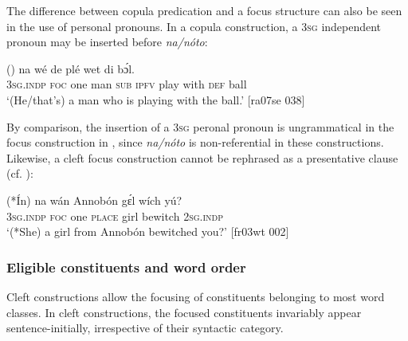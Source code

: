 \ea%
    \label{ex:key:698}
\z\z

The difference between copula predication and a focus structure can also be seen in the use of personal pronouns. In a copula construction, a \textsc{3sg} independent pronoun may be inserted before \textit{na}\textit{\textup{/}}\textit{nóto}:


\ea%
    \label{ex:key:699}
    \gll ()    na       wé  de  plé  wet    di  bɔ́l.\\
\textsc{3sg.indp}  \textsc{foc}  one    man    \textsc{sub}  \textsc{ipfv}  play  with    \textsc{def}  ball\\

\glt ‘(He/that’s) a man who is playing with the ball.’ [ra07se 038]
\z

By comparison, the insertion of a \textsc{3sg} peronal pronoun is ungrammatical in the focus construction in , since \textit{na}\textit{\textup{/}}\textit{nóto} is non-referential in these constructions. Likewise, a cleft focus construction cannot be rephrased as a presentative clause (cf. ):


\ea%
    \label{ex:key:700}
    \gll (*\'{I}n)  na  wán    Annobón  gɛ́l    wích  yú?\\
\textsc{3sg.indp}  \textsc{foc}  one    \textsc{place}    girl    bewitch  \textsc{2sg.indp}\\

\glt ‘(*She) a girl from Annobón bewitched you?’ [fr03wt 002]
\z

\subsubsection{Eligible constituents and word order}\label{sec:7.4.3.2}
Cleft constructions allow the focusing of constituents belonging to most word classes. In cleft constructions, the focused constituents invariably appear sentence-initially, irrespective of their syntactic category.


